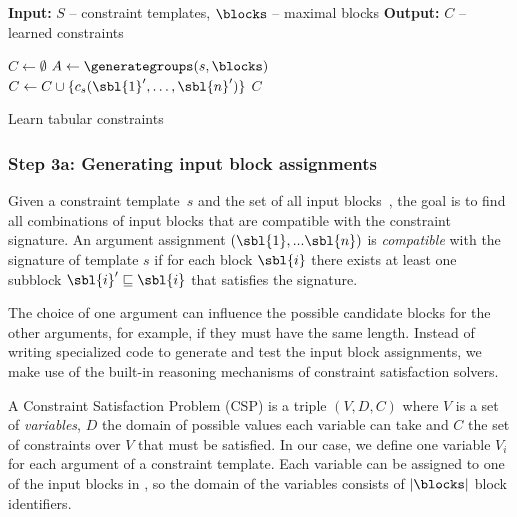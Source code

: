 \newcommand{\temps}{\ensuremath{S}}
\begin{algorithm}[t]
  \begin{algorithmic}[1]
    \footnotesize
    \State \textbf{Input:} $\temps$ -- constraint templates, $\blocks$ -- maximal blocks
    \State \textbf{Output:} $C$ -- learned constraints

    \Procedure{LearnConstraints}{$\blocks$, $\temps$}
      \State $C \gets \emptyset$ %
      \ForAll{$s~\mathbf{in}~\temps$} \label{algo:tcl:for}
        \State $A \gets \generategroups(s, \blocks)$  \label{algo:tcl:super}
            \State $C \gets C \cup \{ c_s(\sbl{1}', \dots, \sbl{n}') \}$
          \EndFor
        \EndFor
      \EndFor
      \State \Return $C$
    \EndProcedure
\end{algorithmic}
\caption{Learn tabular constraints}
\label{algo:tcl}
\end{algorithm}


\subsubsection*{Step 3a: Generating input block assignments}
\label{sec:algo:super}


Given a constraint template~$s$ and the set of all input blocks~\blocks, the goal is to find all combinations of input blocks that are compatible with the constraint signature.
An argument assignment $(\sbl{1}, ... \sbl{n})$ is \textit{compatible} with the signature of template $s$ if for each block $\sbl{i}$ there exists at least one subblock $\sbl{i}' \sqsubseteq \sbl{i}$ that satisfies the signature.

The choice of one argument can influence the possible candidate blocks for the other arguments, for example, if they must have the same length.
Instead of writing specialized code to generate and test the input block assignments, we make use of the built-in reasoning mechanisms of constraint satisfaction solvers.

A Constraint Satisfaction Problem (CSP) is a triple $(V,D,C)$ where $V$ is a set of \textit{variables}, $D$ the domain of possible values each variable can take and $C$ the set of constraints over $V$ that must be satisfied.
In our case, we define one variable $V_i$ for each argument of a constraint template.
Each variable can be assigned to one of the input blocks in \blocks, so the domain of the variables consists of $|\blocks|$ block identifiers.

